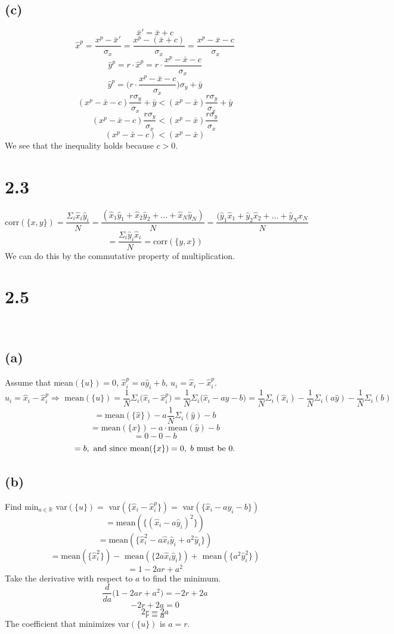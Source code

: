 \documentclass[11pt]{article}
\begin{document}
\subsection*{(c)}
\[\bar{x}'=\bar{x}+c\]
\[\hat{x}^p=\frac{x^p-\bar{x}'}{\sigma_x}=\frac{x^p-(\bar{x}+c)}{\sigma_x}=\frac{x^p-\bar{x}-c}{\sigma_x}\]
\[\hat{y}^p=r\cdot\hat{x}^p=r\cdot\frac{x^p-\bar{x}-c}{\sigma_x}\]
\[\hat{y}^p=\Big(r\cdot\frac{x^p-\bar{x}-c}{\sigma_x}\Big)\sigma_y+\bar{y}\]
\[(x^p-\bar{x}-c)\frac{r\sigma_y}{\sigma_x}+\bar{y}<(x^p-\bar{x})\frac{r\sigma_y}{\sigma_x}+\bar{y}\]
\[(x^p-\bar{x}-c)\frac{r\sigma_y}{\sigma_x}<(x^p-\bar{x})\frac{r\sigma_y}{\sigma_x}\]
\[(x^p-\bar{x}-c)<(x^p-\bar{x})\]
We see that the inequality holds because $c>0$.
\clearpage
\section*{2.3}
\[\text{corr}(\{x,y\})=\frac{\Sigma_i\hat{x}_i\hat{y}_i}{N}=\frac{(\hat{x}_1\hat{y}_1+\hat{x}_2\hat{y}_2+\ldots+\hat{x}_N\hat{y}_N)}{N}=\frac{(\hat{y}_1\hat{x}_1+\hat{y}_2\hat{x}_2+\ldots+\hat{y}_N\hat{x}_N}{N}\]
\[=\frac{\Sigma_i\hat{y}_i\hat{x}_i}{N}=\text{corr}(\{y,x\})\]
We can do this by the commutative property of multiplication.
\\[20mm]
\section*{2.5}
\ \\[10mm]
\subsection*{(a)}
Assume that mean$(\{u\})=0$, $\hat{x}_i^p=a\hat{y}_i+b$, $u_i=\hat{x}_i-\hat{x}_i^p$.
\[u_i=\hat{x}_i-\hat{x}_i^p\Rightarrow\text{ mean}(\{u\})=\frac{1}{N}\Sigma_i\big(\hat{x}_i-\hat{x}_i^p\big)=\frac{1}{N}\Sigma_i\big(\hat{x}_i-a\hat{y}-b\big)=\frac{1}{N}\Sigma_i(\hat{x}_i)-\frac{1}{N}\Sigma_i(a\hat{y})-\frac{1}{N}\Sigma_i(b)\]
\[=\text{mean}(\{\hat{x}\})-a\frac{1}{N}\Sigma_i(\hat{y})-b\]
\[=\text{mean}(\{x\})-a\cdot\text{mean}(\hat{y})-b\]
\[=0-0-b\]
\[=b,\text{ and since mean}(\{x\})=0,\hspace{1mm}b\text{ must be 0}.\]
\clearpage
\subsection*{(b)}
Find $\text{min}_{a\in\mathbb{R}}$ var$(\{u\})=$ var$(\{\hat{x}_i-\hat{x}_i^p\})=$ var$(\{\hat{x}_i-a\hat{y_i}-b\})$
\[=\text{mean}(\{(\hat{x}_i-a\hat{y}_i)^2\})\]
\[=\text{mean}(\{\hat{x}_i^2-a\hat{x}_i\hat{y}_i+a^2\hat{y}_i\})\]
\[=\text{mean}(\{\hat{x}_i^2\})-\text{ mean}(\{2a\hat{x}_i\hat{y}_i\})+\text{ mean}(\{a^2\hat{y}_i^2\})\]
\[=1-2ar+a^2\]
Take the derivative with respect to $a$ to find the minimum.
\[\frac{d}{da}\Big(1-2ar+a^2\Big)=-2r+2a\]
\[-2r+2a=0\]
\[2r=2a\]
\[r=a\]
The coefficient that minimizes var$(\{u\})$ is $a=r$.
\\[20mm]
\end{document}
